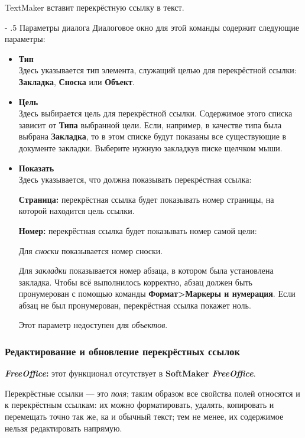 ﻿\documentclass[a4paper,10pt]{article}
\makeatletter
\renewcommand\paragraph{%
   \@startsection{paragraph}{4}{0mm}%
      {-\baselineskip}%
      {.5\baselineskip}%
      {\normalfont\normalsize\bfseries}}
\makeatother
\begin{document}
TextMaker вставит перекрёстную ссылку в текст.

\paragraph{Параметры диалога}
Диалоговое окно для этой команды содержит следующие параметры:
\begin{itemize}
 \item \textbf{Тип}\\
 Здесь указывается тип элемента, служащий целью для перекрёстной ссылки: \textbf{Закладка}, \textbf{Сноска} или \textbf{Объект}.
 \item \textbf{Цель}\\
 Здесь выбирается цель для перекрёстной ссылки. Содержимое этого списка зависит от \textbf{Типа} выбранной цели. Если, например, в качестве типа была выбрана \textbf{Закладка}, то в этом списке будут показаны все существующие в документе закладки. Выберите нужную закладкув писке щелчком мыши.
 \item \textbf{Показать}\\
 Здесь указывается, что должна показывать перекрёстная ссылка:
 
 \textbf{Страница:} перекрёстная ссылка будет показывать номер страницы, на которой находится цель ссылки.
 
 \textbf{Номер:} перекрёстная ссылка будет показывать номер самой цели:
 
 Для \textit{сноски} показывается номер сноски.
 
 Для \textit{закладки} показывается номер абзаца, в котором была установлена закладка. Чтобы всё выполнилось корректно, абзац должен быть пронумерован с помощью команды \textbf{Формат>Маркеры и нумерация}. Если абзац не был пронумерован, перекрёстная ссылка покажет ноль.
 
 Этот параметр недоступен для \textit{объектов}.
\end{itemize}

\subsubsection{Редактирование и обновление перекрёстных ссылок}
\begin{mdframed}[backgroundcolor=pink!50]
\textbf{\textit{FreeOffice}:} этот функционал отсутствует в \textbf{SoftMaker \textit{FreeOffice}}.
\end{mdframed}

Перекрёстные ссылки — это \textit{поля}; таким образом все свойства полей относятся и к перекрёстным ссылкам: их можно форматировать, удалять, копировать и перемещать точно так же, ка и обычный текст; тем не менее, их содержимое нельзя редактировать напрямую.
\end{document}
